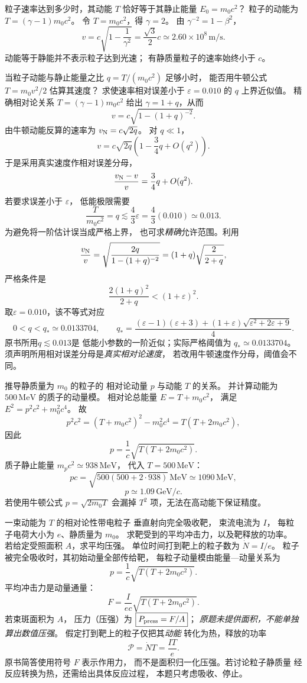 粒子速率达到多少时，其动能
$T$ 恰好等于其静止能量 $E_0=m_0c^2$？
\exsolution
粒子的动能为
$T=(\gamma-1)m_0c^2$。
令 $T=m_0c^2$，得 $\gamma=2$。
由
$\gamma^{-2}=1-\beta^2$，
\[
\boxed{v=c\sqrt{1-\frac1{\gamma^2}}
=\frac{\sqrt3}{2}c
\simeq2.60\times10^8\,\mathrm{m/s}}.
\]
\excheck 动能等于静能并不表示粒子达到光速；
有静质量粒子的速率始终小于 $c$。

当粒子动能与静止能量之比
$q=T/(m_0c^2)$ 足够小时，
能否用牛顿公式 $T=m_0v^2/2$ 估算其速度？
求使速率相对误差小于
$\varepsilon=0.010$ 的 $q$ 上界近似值。
\exsolution
精确相对论关系
$T=(\gamma-1)m_0c^2$
给出 $\gamma=1+q$，从而
\[
v=c\sqrt{1-(1+q)^{-2}}.
\]
由牛顿动能反算的速率为
$v_{\rm N}=c\sqrt{2q}$。
对 $q\ll1$，
\[
v=c\sqrt{2q}
\left(1-\frac34q+O(q^2)\right).
\]
于是采用真实速度作相对误差分母，
\[
\frac{v_{\rm N}-v}{v}
=\frac34q+O(q^2).
\]
若要求误差小于 $\varepsilon$，
低能极限需要
\[
\boxed{\frac{T}{m_0c^2}=q
\lesssim\frac43\varepsilon
=\frac43(0.010)
\simeq0.013}.
\]
为避免将一阶估计误当成严格上界，
也可求\emph{精确}允许范围。利用
\[
\frac{v_{\rm N}}{v}
=\sqrt{\frac{2q}{1-(1+q)^{-2}}}
=(1+q)\sqrt{\frac{2}{2+q}},
\]
严格条件是
\[
\boxed{\frac{2(1+q)^2}{2+q}<(1+\varepsilon)^2}.
\]
取$\varepsilon=0.010$，该不等式对应
\[
\boxed{0<q<q_* \simeq0.0133704},\qquad
q_*=\frac{(\varepsilon-1)(\varepsilon+3)
 +(1+\varepsilon)\sqrt{\varepsilon^2+2\varepsilon+9}}4.
\]
\excheck 原书所用$q\lesssim 0.013$是
低能小参数的一阶近似；实际严格阈值为
$q_*\simeq0.0133704$。
须声明所用相对误差分母是\emph{真实相对论速度}，
若改用牛顿速度作分母，阈值会不同。

推导静质量为 $m_0$ 的粒子的
相对论动量 $p$ 与动能 $T$ 的关系。
并计算动能为 $500\,\mathrm{MeV}$
的质子的动量模。
\exsolution
相对论总能量
$E=T+m_0c^2$，
满足
$E^2=p^2c^2+m_0^2c^4$。
故
\[
p^2c^2=(T+m_0c^2)^2-m_0^2c^4
=T(T+2m_0c^2),
\]
因此
\[
\boxed{p=\frac1c
\sqrt{T(T+2m_0c^2)}}.
\]
质子静止能量
$m_pc^2\simeq938\,\mathrm{MeV}$，
代入 $T=500\,\mathrm{MeV}$：
\[
pc=\sqrt{500(500+2\cdot938)}\,\mathrm{MeV}
\simeq1090\,\mathrm{MeV},
\]
\[
\boxed{p\simeq1.09\,\mathrm{GeV}/c}.
\]
\excheck 若使用牛顿公式 $p=\sqrt{2m_0T}$
会漏掉 $T^2$ 项，无法在高动能下保证精度。

一束动能为 $T$ 的相对论性带电粒子
垂直射向完全吸收靶，
束流电流为 $I$，
每粒子电荷大小为 $e$、静质量为 $m_0$。
求靶受到的平均冲击力，以及靶释放的功率。
若给定受照面积 $A$，求平均压强。
\exsolution
单位时间打到靶上的粒子数为
$\dot N=I/e$。
粒子被完全吸收时，其初始动量全部传给靶，
每粒子动量模由能量—动量关系为
\[
p=\frac1c\sqrt{T(T+2m_0c^2)}.
\]
平均冲击力是动量通量：
\[
\boxed{F=\frac{I}{ec}
\sqrt{T(T+2m_0c^2)}}.
\]
若束斑面积为 $A$，
压力（压强）为
$\boxed{P_{\rm press}=F/A}$；
\emph{原题未提供面积，不能单独算出数值压强}。
假定打到靶上的粒子仅把其\emph{动能}
转化为热，释放的功率
\[
\boxed{\mathcal P=\dot NT=\frac{IT}{e}}.
\]
\excheck 原书简答使用符号 $F$ 表示作用力，
而不是面积归一化压强。若讨论粒子静质量
经反应转换为热，还需给出具体反应过程，
本题只考虑吸收、停止。

